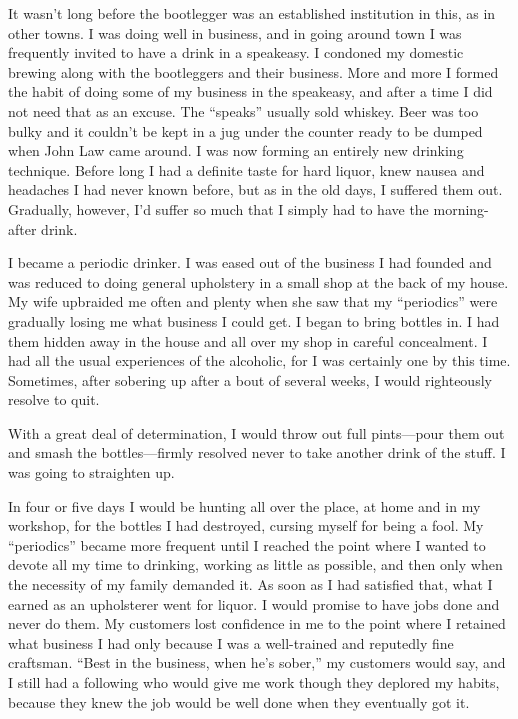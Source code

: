 \begin{biblechapter}
It wasn’t long before the bootlegger was an established institution in this, as in other towns. I was doing well in business, and in going around town I was frequently invited to have a drink in a speakeasy. I condoned my domestic brewing along with the bootleggers and their business. More and more I formed the habit of doing some of my business in the speakeasy, and after a time I did not need that as an excuse. The “speaks” usually sold whiskey. Beer was too bulky and it couldn’t be kept in a jug under the counter ready to be dumped when John Law came around. I was now forming an entirely new drinking technique. Before long I had a definite taste for hard liquor, knew nausea and headaches I had never known before, but as in the old days, I suffered them out. Gradually, however, I’d suffer so much that I simply had to have the morning-after drink.

I became a periodic drinker. I was eased out of the business I had founded and was reduced to doing general upholstery in a small shop at the back of my house. My wife upbraided me often and plenty when she saw that my “periodics” were gradually losing me what business I could get. I began to bring bottles in. I had them hidden away in the house and all over my shop in careful concealment. I had all the usual experiences of the alcoholic, for I was certainly one by this time. Sometimes, after sobering up after a bout of several weeks, I would righteously resolve to quit.

With a great deal of determination, I would throw out full pints—pour them out and smash the bottles—firmly resolved never to take another drink of the stuff. I was going to straighten up.

In four or five days I would be hunting all over the place, at home and in my workshop, for the bottles I had destroyed, cursing myself for being a fool. My “periodics” became more frequent until I reached the point where I wanted to devote all my time to drinking, working as little as possible, and then only when the necessity of my family demanded it. As soon as I had satisfied that, what I earned as an upholsterer went for liquor. I would promise to have jobs done and never do them. My customers lost confidence in me to the point where I retained what business I had only because I was a well-trained and reputedly fine craftsman. “Best in the business, when he’s sober,” my customers would say, and I still had a following who would give me work though they deplored my habits, because they knew the job would be well done when they eventually got it.


\end{biblechapter}
